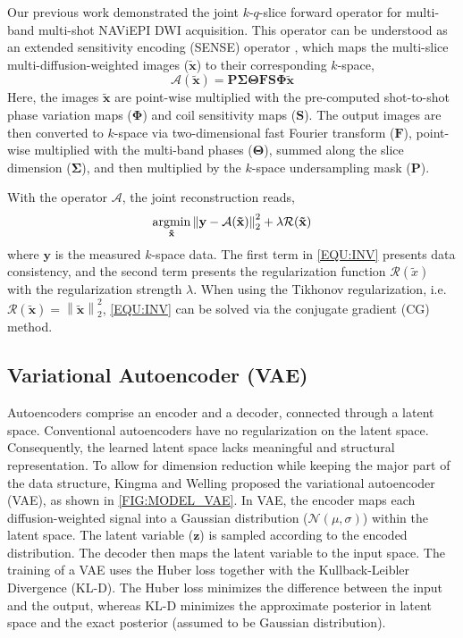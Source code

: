 \documentclass[journal,twoside,web]{ieeecolor}
\newcommand{\argmin}{\operatornamewithlimits{argmin}}
\newcommand{\norm}[1]{\left\lVert#1\right\rVert}
\begin{document}
	Our previous work \cite{tan_2024_naviepi} demonstrated
	the joint $k$-$q$-slice forward operator
	for multi-band multi-shot NAViEPI DWI acquisition.
	This operator can be understood as
	an extended sensitivity encoding (SENSE) operator \cite{pruessmann_2001_gsense},
	which maps the multi-slice multi-diffusion-weighted images ($\mathbf{\tilde{x}}$)
	to their corresponding $k$-space,
	\begin{equation}
		\mathcal{A}(\mathbf{\tilde{x}}) = \mathbf{P \Sigma \Theta F S \Phi} \mathbf{\tilde{x}}
		\label{EQU:FWD}
	\end{equation}
	Here, the images $\mathbf{\tilde{x}}$ are point-wise multiplied
	with the pre-computed shot-to-shot phase variation maps ($\mathbf{\Phi}$)
	and coil sensitivity maps ($\mathbf{S}$).
	The output images are then converted to $k$-space
	via two-dimensional fast Fourier transform ($\mathbf{F}$),
	point-wise multiplied with the multi-band phases ($\mathbf{\Theta}$),
	summed along the slice dimension ($\mathbf{\Sigma}$),
	and then multiplied by the $k$-space undersampling mask ($\mathbf{P}$).

	With the operator $\mathcal{A}$, the joint reconstruction reads,
	\begin{equation}
		\argmin_{\mathbf{\tilde{x}}} \norm{\mathbf{y} - \mathcal{A}(\mathbf{\tilde{x}})}_2^2 + \lambda \mathcal{R}(\mathbf{\tilde{x}})
		\label{EQU:INV}
	\end{equation}
	where $\mathbf{y}$ is the measured $k$-space data.
	The first term in \cref{EQU:INV} presents data consistency, and
	the second term presents the regularization function $\mathcal{R}(\tilde{x})$
	with the regularization strength $\lambda$.
	When using the Tikhonov regularization,
	i.e.~$\mathcal{R}(\mathbf{\tilde{x}}) = \norm{\mathbf{\tilde{x}}}_2^2$,
	\cref{EQU:INV} can be solved via the conjugate gradient (CG) method.

	\subsection{Variational Autoencoder (VAE)}

	Autoencoders comprise an encoder and a decoder, connected through a latent space.
	Conventional autoencoders have no regularization
	on the latent space.
	Consequently, the learned latent space lacks meaningful
	and structural representation.
	To allow for dimension reduction while keeping the major part of
	the data structure,
	Kingma and Welling \cite{kingma_2014_vae} proposed
	the variational autoencoder (VAE), as shown in \cref{FIG:MODEL_VAE}.
	In VAE, the encoder maps each diffusion-weighted signal
	into a Gaussian distribution ($\mathcal{N}(\mu, \sigma)$) within the latent space.
	The latent variable ($\mathbf{z}$) is sampled according to the encoded distribution.
	The decoder then maps the latent variable to the input space.
	The training of a VAE uses the Huber loss together with the Kullback-Leibler Divergence (KL-D).
	The Huber loss minimizes the difference between the input and the output,
	whereas KL-D minimizes the approximate posterior in latent space and
	the exact posterior (assumed to be Gaussian distribution).
\end{document}
